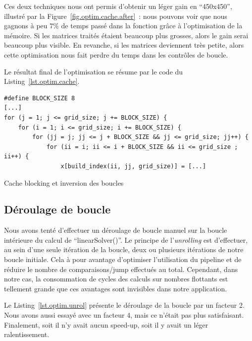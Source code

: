 \documentclass[12pt,a4paper]{article}
\begin{document}
Ces deux techniques nous ont permis d'obtenir un léger gain en
\enquote{450x450}, illustré par la Figure~\ref{fig.optim.cache.after} : nous
pouvons voir que nous gagnons à peu $7\%$ de temps passé dans la fonction grâce
à l'optimisation de la mémoire. Si les matrices traités étaient beaucoup plus
grosses, alors le gain serai beaucoup plus visible. En revanche, si les matrices
deviennent très petite, alors cette optimisation nous fait perdre du temps dans
les contrôles de boucle.

Le résultat final de l'optimisation se résume par le code du Listing~\ref{lst.optim.cache}.
\begin{listing}[h]
    \begin{verbatim}
#define BLOCK_SIZE 8
[...]
for (j = 1; j <= grid_size; j += BLOCK_SIZE) {
    for (i = 1; i <= grid_size; i += BLOCK_SIZE) {
        for (jj = j; jj <= j + BLOCK_SIZE && jj <= grid_size; jj++) {
            for (ii = i; ii <= i + BLOCK_SIZE && ii <= grid_size ; ii++) {
                x[build_index(ii, jj, grid_size)] = [...]
    \end{verbatim}
    \caption{Cache blocking et inversion des boucles}
    \label{lst.optim.cache}
\end{listing}

\subsection{Déroulage de boucle}
\label{sub.optim.unrol}

Nous avons tenté d'effectuer un déroulage de boucle manuel sur la boucle
intérieure du calcul de \enquote{linearSolver()}. Le principe de
l'\textit{unrolling} est d'effectuer, au sein d'une seule itération de la
boucle, deux ou plusieurs itérations de notre boucle initiale. Cela à pour
avantage d'optimiser l'utilisation du pipeline et de réduire le nombre de
comparaisons/jump effectués au total. Cependant, dans notre cas, la consommation
de cycles des calculs sur nombres flottants est tellement grande que ces
avantages sont invisibles dans notre application.

Le Listing~\ref{lst.optim.unrol} présente le déroulage de la boucle par un
facteur 2. Nous avons aussi essayé avec un facteur 4, mais ce n'était pas plus
satisfaisant. Finalement, soit il n'y avait aucun speed-up, soit il y avait un
léger ralentissement.
\end{document}
